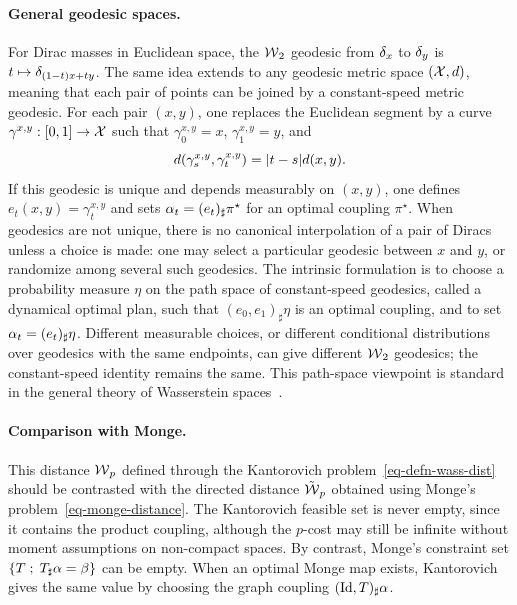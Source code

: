 \paragraph{General geodesic spaces.}
For Dirac masses in Euclidean space, the $\operatorname{\mathcal{W}}_2$ geodesic from $\delta_x$ to $\delta_y$ is $t\mapsto\delta_{(1-t)x+t y}$. The same idea extends to any geodesic metric space $(\mathcal{X},d)$, meaning that each pair of points can be joined by a constant-speed metric geodesic. For each pair $(x,y)$, one replaces the Euclidean segment by a curve $\gamma^{x,y}:[0,1]\to\mathcal{X}$ such that $\gamma^{x,y}_0=x$, $\gamma^{x,y}_1=y$, and
\[
	d(\gamma^{x,y}_s,\gamma^{x,y}_t)=|t-s|d(x,y).
\]
If this geodesic is unique and depends measurably on $(x,y)$, one defines $e_t(x,y)=\gamma^{x,y}_t$ and sets $\alpha_t=(e_t)_\sharp\pi^\star$ for an optimal coupling $\pi^\star$. When geodesics are not unique, there is no canonical interpolation of a pair of Diracs unless a choice is made: one may select a particular geodesic between $x$ and $y$, or randomize among several such geodesics. The intrinsic formulation is to choose a probability measure $\eta$ on the path space of constant-speed geodesics, called a dynamical optimal plan, such that $(e_0,e_1)_\sharp\eta$ is an optimal coupling, and to set $\alpha_t=(e_t)_\sharp\eta$. Different measurable choices, or different conditional distributions over geodesics with the same endpoints, can give different $\operatorname{\mathcal{W}}_2$ geodesics; the constant-speed identity remains the same. This path-space viewpoint is standard in the general theory of Wasserstein spaces~\cite{ambrosio2006gradient,Villani09,SantambrogioBook}.


\paragraph{Comparison with Monge.}

	This distance $\operatorname{\mathcal{W}}_p$ defined through the Kantorovich problem~\eqref{eq-defn-wass-dist} should be contrasted with the directed distance $\tilde{\operatorname{\mathcal{W}}}_p$ obtained using Monge's problem~\eqref{eq-monge-distance}. The Kantorovich feasible set is never empty, since it contains the product coupling, although the $p$-cost may still be infinite without moment assumptions on non-compact spaces. By contrast, Monge's constraint set $\left\{ T \;;\; T_\sharp \alpha=\beta \right\}$ can be empty. When an optimal Monge map exists, Kantorovich gives the same value by choosing the graph coupling $(\mathrm{Id},T)_\sharp\alpha$.

